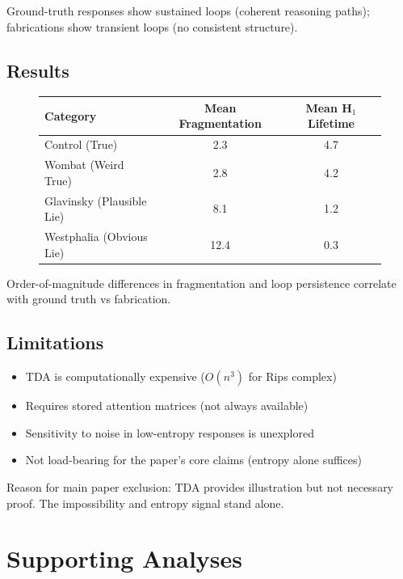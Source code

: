 \documentclass[12pt]{article}
\begin{document}
Ground-truth responses show sustained loops (coherent reasoning paths); fabrications show transient loops (no consistent structure).

\subsection{Results}

\begin{figure}[H]
\centering
\begin{tabular}{lcc}
\toprule
\textbf{Category} & \textbf{Mean Fragmentation} & \textbf{Mean H$_1$ Lifetime} \\
\midrule
Control (True) & 2.3 & 4.7 \\
Wombat (Weird True) & 2.8 & 4.2 \\
Glavinsky (Plausible Lie) & 8.1 & 1.2 \\
Westphalia (Obvious Lie) & 12.4 & 0.3 \\
\bottomrule
\end{tabular}
\end{figure}

Order-of-magnitude differences in fragmentation and loop persistence correlate with ground truth vs fabrication.

\subsection{Limitations}

\begin{itemize}
    \item TDA is computationally expensive ($O(n^3)$ for Rips complex)
    \item Requires stored attention matrices (not always available)
    \item Sensitivity to noise in low-entropy responses is unexplored
    \item Not load-bearing for the paper's core claims (entropy alone suffices)
\end{itemize}

Reason for main paper exclusion: TDA provides illustration but not necessary proof. The impossibility and entropy signal stand alone.


\section{Supporting Analyses}
\end{document}
